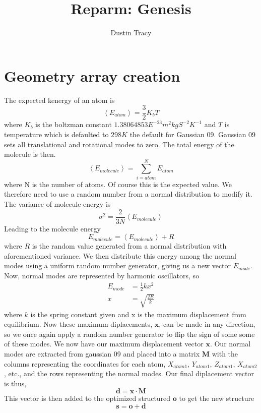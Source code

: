 \documentclass[12pt]{article}
\title{Reparm: Genesis}
\author{Dustin Tracy}
\begin{document}
\maketitle

\section{Geometry array creation}
The expected kenergy of an atom is
\begin{equation}
  \label{eq:energy_atom}
  \left<E_{atom}\right>=\frac{3}{2}K_{b}T
\end{equation}
where $K_b$ is the boltzman constant $1.38064853E^{-23}m^2kgS^{-2}K^{-1}$ and $T$ is temperature which is defaulted to $298K$ the default for Gaussian 09.
Gaussian 09 sets all translational and rotational modes to zero.
The total energy of the molecule is then.
\begin{equation}
  \label{eq:energy_molecule}
 \left<E_{molecule}\right>=\sum_{i=atom}^{N}E_{atom}
\end{equation}
where N is the number of atoms.
Of course this is the expected value.
We therefore need to use a random number from a normal distribution to modify it. 
The variance of molecule energy is
\begin{equation}
  \label{eq:energy_variance}
  \sigma^2=\frac{2}{3N}\left<E_{molecule}\right>
\end{equation}
Leading to the molecule energy
\begin{equation}
  \label{eq:adj_molecule_energy}
  E_{molecule}= \left<E_{molecule}\right> + R
\end{equation}
where $R$ is the random value generated from a normal distribution with aforementioned variance.
We then distribute this energy among the normal modes using a uniform random number generator, giving us a new vector $E_{mode}$.
Now, normal modes are represented by harmonic oscillators, so 
\begin{align}
  E_{mode}&=\frac{1}{2}kx^2\\
  x&=\sqrt{\frac{2E}{k}}
\end{align}
where $k$ is the spring constant given  and x is the maximum displacement from equilibrium.
Now these maximum diplacements, $\mathbf{x}$, can be made in any direction, so we once again apply a random number generator to flip the sign of some some of these modes.
We now have our maximum displacement vector $\mathbf{x}$.
Our normal modes are extracted from gaussian 09 and placed into a matrix $\mathbf{M}$ with the columns representing the coordinates for each atom, $X_{atom1}$, $Y_{atom1}$, $Z_{atom1}$, $X_{atom2}$, etc., and the rows representing the normal modes.
Our final diplacement vector is thus,
\begin{equation}
  \label{eq:displacement}
 \mathbf{d}=\mathbf{x} \cdot \mathbf{M}
\end{equation}
This vector is then added to the optimized structured $\mathbf{o}$ to get the new structure
\begin{equation}
  \mathbf{s} = \mathbf{o} + \mathbf{d}
\end{equation}
\end{document}
